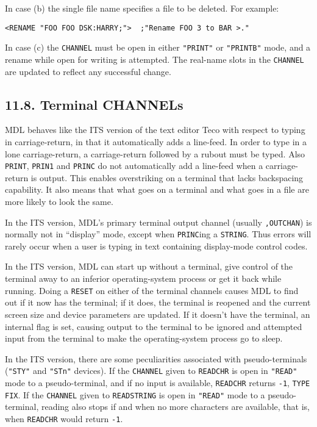 \documentclass[a4paper,]{article}
\begin{document}
In case (b) the single file name specifies a file to be deleted. For example:

\begin{verbatim}
<RENAME "FOO FOO DSK:HARRY;">  ;"Rename FOO 3 to BAR >."
\end{verbatim}

In case (c) the \texttt{CHANNEL} must be open in either \texttt{"PRINT"} or \texttt{"PRINTB"} mode, and a rename while open
for writing is attempted. The real-name slots in the \texttt{CHANNEL} are updated to reflect any successful change.

\subsection{11.8. Terminal CHANNELs}\label{terminal-channels}

MDL behaves like the ITS  version of the text editor Teco with respect to typing in carriage-return, in
that it automatically adds a line-feed. In order to type in a lone carriage-return, a carriage-return followed by a rubout
must be typed. Also \texttt{PRINT}, \texttt{PRIN1} and \texttt{PRINC}
 do not automatically add a line-feed when a carriage-return is output. This enables overstriking on
a terminal that lacks backspacing capability. It also means that what goes on a terminal and what goes in a file are more
likely to look the same.

In the ITS version, MDL's primary terminal output channel (usually \texttt{,OUTCHAN}) is normally not in ``display'' mode,
except when \texttt{PRINC}ing a \texttt{STRING}. Thus errors will rarely occur when a user is typing in text containing
display-mode control codes.

In the ITS version, MDL can start up without a terminal, give control of the terminal away to an inferior operating-system
process or get it back while running. Doing a \texttt{RESET}  on either of the terminal channels
causes MDL to find out if it now has the terminal; if it does, the terminal is reopened and the current screen size and
device parameters are updated. If it doesn't have the terminal, an internal flag is set, causing output to the terminal to
be ignored and attempted input from the terminal to make the operating-system process go to sleep.

In the ITS version, there are some peculiarities associated with pseudo-terminals (\texttt{"STY"}
 and \texttt{"STn"} devices). If the \texttt{CHANNEL} given to \texttt{READCHR}
 is open in \texttt{"READ"} mode to a pseudo-terminal, and if no input is available,
\texttt{READCHR} returns \texttt{-1}, \texttt{TYPE} \texttt{FIX}. If the \texttt{CHANNEL} given to \texttt{READSTRING}
 is open in \texttt{"READ"} mode to a pseudo-terminal, reading also stops if and when no more
characters are available, that is, when \texttt{READCHR} would return \texttt{-1}.
\end{document}
